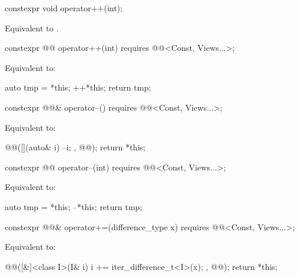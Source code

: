 \begin{itemdecl}
constexpr void operator++(int);
\end{itemdecl}

\begin{itemdescr}
\pnum
\effects
Equivalent to .
\end{itemdescr}

\begin{itemdecl}
constexpr @@ operator++(int) requires @@<Const, Views...>;
\end{itemdecl}

\begin{itemdescr}
\pnum
\effects
Equivalent to:
\begin{codeblock}
auto tmp = *this;
++*this;
return tmp;
\end{codeblock}
\end{itemdescr}

\begin{itemdecl}
constexpr @@& operator--() requires @@<Const, Views...>;
\end{itemdecl}

\begin{itemdescr}
\pnum
\effects
Equivalent to:
\begin{codeblock}
@@([](auto& i) { --i; }, @@);
return *this;
\end{codeblock}
\end{itemdescr}

\begin{itemdecl}
constexpr @@ operator--(int) requires @@<Const, Views...>;
\end{itemdecl}

\begin{itemdescr}
\pnum
\effects
Equivalent to:
\begin{codeblock}
auto tmp = *this;
--*this;
return tmp;
\end{codeblock}
\end{itemdescr}

\begin{itemdecl}
constexpr @@& operator+=(difference_type x)
  requires @@<Const, Views...>;
\end{itemdecl}

\begin{itemdescr}
\pnum
\effects
Equivalent to:
\begin{codeblock}
@@([&]<class I>(I& i) { i += iter_difference_t<I>(x); }, @@);
return *this;
\end{codeblock}
\end{itemdescr}

